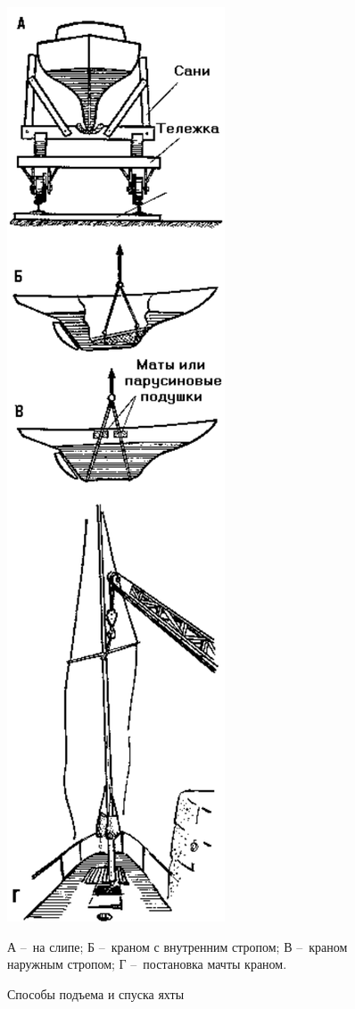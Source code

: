 \documentclass[a4paper, 12pt, twoside, final]{scrbook}
\begin{document}
\begin{figure}
   \centering
   \includegraphics[scale=0.9]{75_Sposoby_spuska} %
   \caption{Способы подъема и спуска яхты}
   \label{fig:75}
   \centering\small
   А \---~на слипе; Б \---~краном с внутренним стропом; В \---~краном наружным стропом; Г \---~постановка мачты краном.
\end{figure}
\end{document}
